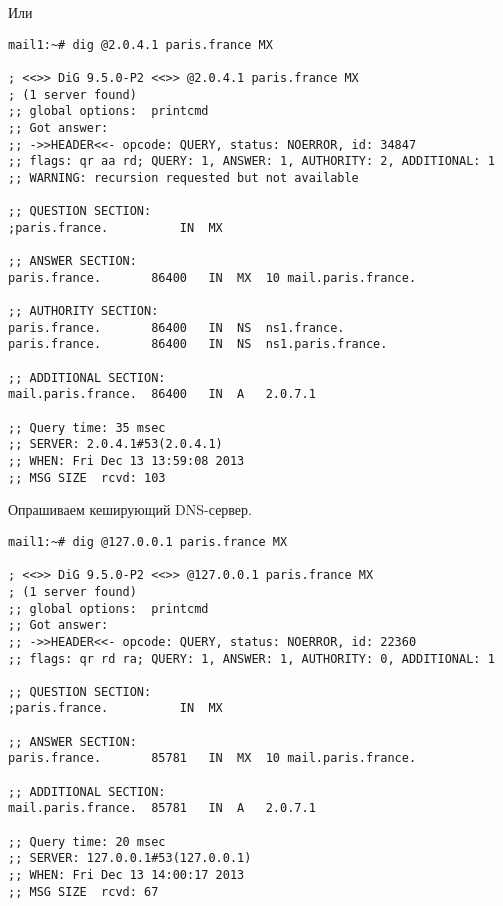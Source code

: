 \documentclass[a4paper,12pt]{article}
\begin{document}
Или
\begin{Verbatim}
mail1:~# dig @2.0.4.1 paris.france MX

; <<>> DiG 9.5.0-P2 <<>> @2.0.4.1 paris.france MX
; (1 server found)
;; global options:  printcmd
;; Got answer:
;; ->>HEADER<<- opcode: QUERY, status: NOERROR, id: 34847
;; flags: qr aa rd; QUERY: 1, ANSWER: 1, AUTHORITY: 2, ADDITIONAL: 1
;; WARNING: recursion requested but not available

;; QUESTION SECTION:
;paris.france.			IN	MX

;; ANSWER SECTION:
paris.france.		86400	IN	MX	10 mail.paris.france.

;; AUTHORITY SECTION:
paris.france.		86400	IN	NS	ns1.france.
paris.france.		86400	IN	NS	ns1.paris.france.

;; ADDITIONAL SECTION:
mail.paris.france.	86400	IN	A	2.0.7.1

;; Query time: 35 msec
;; SERVER: 2.0.4.1#53(2.0.4.1)
;; WHEN: Fri Dec 13 13:59:08 2013
;; MSG SIZE  rcvd: 103
\end{Verbatim}

Опрашиваем кеширующий DNS-сервер.
\begin{Verbatim}
mail1:~# dig @127.0.0.1 paris.france MX

; <<>> DiG 9.5.0-P2 <<>> @127.0.0.1 paris.france MX
; (1 server found)
;; global options:  printcmd
;; Got answer:
;; ->>HEADER<<- opcode: QUERY, status: NOERROR, id: 22360
;; flags: qr rd ra; QUERY: 1, ANSWER: 1, AUTHORITY: 0, ADDITIONAL: 1

;; QUESTION SECTION:
;paris.france.			IN	MX

;; ANSWER SECTION:
paris.france.		85781	IN	MX	10 mail.paris.france.

;; ADDITIONAL SECTION:
mail.paris.france.	85781	IN	A	2.0.7.1

;; Query time: 20 msec
;; SERVER: 127.0.0.1#53(127.0.0.1)
;; WHEN: Fri Dec 13 14:00:17 2013
;; MSG SIZE  rcvd: 67
\end{Verbatim}
\end{document}
